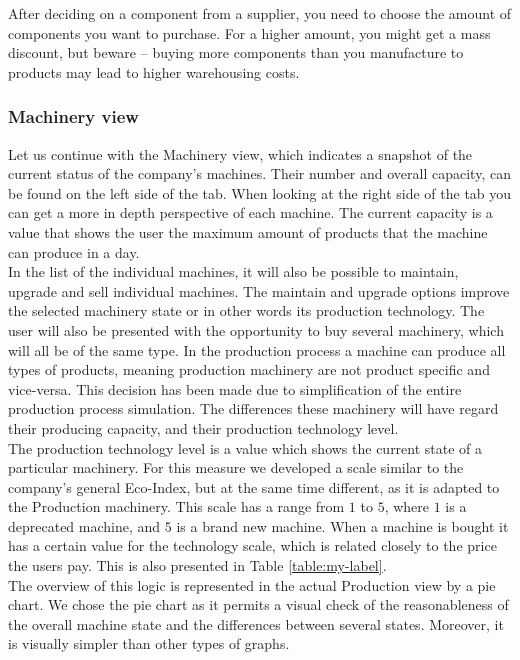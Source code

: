 After deciding on a component from a supplier, you need to choose the amount of components you want to purchase. For a higher amount, you might get a mass discount, but beware --  buying more components than you manufacture to products may lead to higher warehousing costs. 


\subsubsection{Machinery view} 
\label{sub:MachineryView}
Let us continue with the Machinery view, which indicates a snapshot of the current status of the company’s machines. Their number and overall capacity, can be found on the left side of the tab. When looking at the right side of the tab you can get a more in depth perspective of each machine. The current capacity is a value that shows the user the maximum amount of products that the machine can produce in a day. \\
 In the list of the individual machines, it will also be possible to maintain, upgrade and sell individual machines. The maintain and upgrade options improve the selected machinery state or in other words its production technology. 
The user will also be presented with the opportunity to buy several machinery, which will all be of the same type. In the production process a machine can produce all types of products, meaning production machinery are not product specific and vice-versa. This decision has been made due to simplification of the entire production process simulation. The differences these machinery will have regard their producing capacity, and their production technology level. \\
The production technology level is a value which shows the current state of a particular machinery. For this measure we developed a scale similar to the company’s general Eco-Index, but at the same time different, as it is adapted to the Production machinery.  This scale has a range from $1$ to $5$, where $1$ is a deprecated machine, and $5$ is a brand new machine. When a machine is bought it has a certain value for the technology scale, which is related closely to the price the users pay. This is also presented in Table \ref{table:my-label}. \\
The overview of this logic is represented in the actual Production view by a pie chart. We chose the pie chart as it permits a visual check of the reasonableness of the overall machine state and the differences between several states. Moreover, it is visually simpler than other types of graphs.
